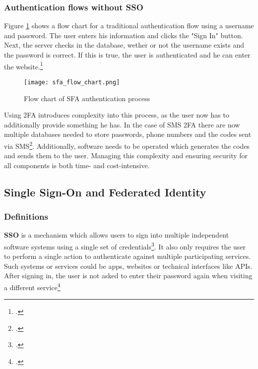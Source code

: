 \subsubsection{Authentication flows without SSO}

Figure \ref{fig:sfa_flow_chart} shows a flow chart for a traditional authentication flow using a username and password.
The user enters his information and clicks the "Sign In" button. Next, the server checks in the database,
wether or not the username exists and the password is correct. If this is true, the user is authenticated
and he can enter the website.\footcite[Cp.][p. 400]{Basavala2012}

\begin{figure}[H]
    \centering
    \caption{Flow chart of SFA authentication process}
	\label{fig:sfa_flow_chart}
    \texttt{[image: sfa\_flow\_chart.png]}
    \\
    \cite[Source:][]{Basavala2012}
\end{figure}

Using \ac{2FA} introduces complexity into this process, as the user now has to additionally provide something he has.
In the case of \ac{SMS} \ac{2FA} there are now multiple databases needed to store passwords,
phone numbers and the codes sent via \ac{SMS}\footcite[Cp.][p. 400]{Basavala2012}. 
Additionally, software needs to be operated which generates the
codes and sends them to the user.
Managing this complexity and ensuring security for all components is both time- and cost-intensive.

\subsection{Single Sign-On and Federated Identity}
\subsubsection{Definitions}

\textbf{\ac{SSO}} is a mechanism which allows users to sign into multiple independent software systems
using a single set of credentials\footcite[Cp.][134]{Radha2012}.
It also only requires the user to perform a single action to authenticate against multiple participating services.
Such systems or services could be apps, websites or technical interfaces like \acp{API}.
After signing in, the user is not asked to enter their password again when visiting a different service\footcite[Cp.][p. 18]{Bazaz2016}


